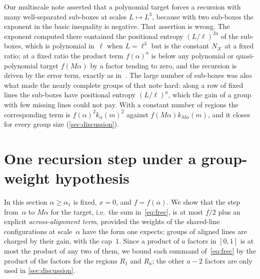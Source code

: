 \documentclass[11pt,letterpaper]{article}
\begin{document}
\begin{remark}
\label{rem:correction}
Our multiscale note asserted that a polynomial target forces a recursion with many well-separated sub-boxes at scales $L\mapsto L^3$, because with two sub-boxes the exponent in the basic inequality is negative. That assertion is wrong. The exponent computed there contained the positional entropy $(L/\ell)^{2a}$ of the sub-boxes, which is polynomial in~$\ell$ when $L=\ell^3$ but is the constant $N_{\mathcal K}$ at a fixed ratio; at a fixed ratio the product term $f(\alpha)^a$ is below any polynomial or quasi-polynomial target $f(M\alpha)$ by a factor tending to zero, and the recursion is driven by the error term, exactly as in~\cite{Gou08}. The large number of sub-boxes was also what made the nearly complete groups of that note hard: along a row of fixed lines the sub-boxes have positional entropy $(L/\ell)^a$, which the gain of a group with few missing lines could not pay. With a constant number of regions the corresponding term is $f(\alpha)^2k_\alpha(m)^2$ against $f(M\alpha)k_{M\alpha}(m)$, and it closes for every group size (\cref{sec:discussion}).
\end{remark}

\section{One recursion step under a group-weight hypothesis}
\label{sec:onestep}

In this section $\alpha\ge\alpha_1$ is fixed, $x=0$, and $f=f(\alpha)$. We show that the step from~$\alpha$ to $M\alpha$ for the target, i.e.\ the sum in~\eqref{eq:frec}, is at most $f/2$ plus an explicit \emph{across-alignment term}, provided the weights of the shared-line configurations at scale~$\alpha$ have the form one expects: groups of aligned lines are charged by their gain, with the cap~$1$. Since a product of $a$ factors in $[0,1]$ is at most the product of any two of them, we bound each summand of~\eqref{eq:frec} by the product of the factors for the regions $R_1$ and $R_a$; the other $a-2$ factors are only used in \cref{sec:discussion}.
\end{document}
